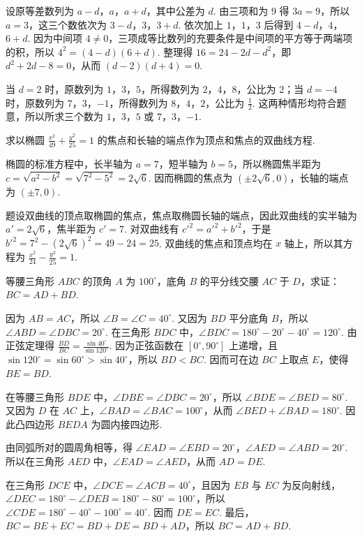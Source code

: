 \begin{solution}
设原等差数列为 \(a-d\)，\(a\)，\(a+d\)，其中公差为 \(d\). 由三项和为 \(9\) 得 \(3a=9\)，所以 \(a=3\)，这三个数依次为 \(3-d\)，\(3\)，\(3+d\). 依次加上 \(1\)，\(1\)，\(3\) 后得到 \(4-d\)，\(4\)，\(6+d\). 因为中间项 \(4\ne0\)，三项成等比数列的充要条件是中间项的平方等于两端项的积，所以 \(4^2=(4-d)(6+d)\). 整理得 \(16=24-2d-d^2\)，即 \(d^2+2d-8=0\)，从而 \((d-2)(d+4)=0\).

当 \(d=2\) 时，原数列为 \(1\)，\(3\)，\(5\)，所得数列为 \(2\)，\(4\)，\(8\)，公比为 \(2\)；当 \(d=-4\) 时，原数列为 \(7\)，\(3\)，\(-1\)，所得数列为 \(8\)，\(4\)，\(2\)，公比为 \(\frac12\). 这两种情形均符合题意，所以所求三个数为 \(1\)，\(3\)，\(5\) 或 \(7\)，\(3\)，\(-1\).
\end{solution}

\begin{problem}
求以椭圆 \( \frac{x^2}{49}+\frac{y^2}{25}=1 \) 的焦点和长轴的端点作为顶点和焦点的双曲线方程.
\end{problem}

\begin{solution}
椭圆的标准方程中，长半轴为 \(a=7\)，短半轴为 \(b=5\)，所以椭圆焦半距为 \(c=\sqrt{a^2-b^2}=\sqrt{7^2-5^2}=2\sqrt6\). 因而椭圆的焦点为 \((\pm2\sqrt6,0)\)，长轴的端点为 \((\pm7,0)\).

题设双曲线的顶点取椭圆的焦点，焦点取椭圆长轴的端点，因此双曲线的实半轴为 \(a'=2\sqrt6\)，焦半距为 \(c'=7\). 对双曲线有 \({c'}^2={a'}^2+{b'}^2\)，于是 \({b'}^2=7^2-(2\sqrt6)^2=49-24=25\). 双曲线的焦点和顶点均在 \(x\) 轴上，所以其方程为 \(\frac{x^2}{24}-\frac{y^2}{25}=1\).
\end{solution}

\begin{problem}
等腰三角形 \(ABC\) 的顶角 \(A\) 为 \( 100^\circ \)，底角 \(B\) 的平分线交腰 \(AC\) 于 \(D\)，求证：\( BC=AD+BD \).
\end{problem}

\begin{solution}
因为 \(AB=AC\)，所以 \(\angle B=\angle C=40^\circ\). 又因为 \(BD\) 平分底角 \(B\)，所以 \(\angle ABD=\angle DBC=20^\circ\). 在三角形 \(BDC\) 中，\(\angle BDC=180^\circ-20^\circ-40^\circ=120^\circ\). 由正弦定理得 \(\frac{BD}{BC}=\frac{\sin40^\circ}{\sin120^\circ}\). 因为正弦函数在 \([0^\circ,90^\circ]\) 上递增，且 \(\sin120^\circ=\sin60^\circ>\sin40^\circ\)，所以 \(BD<BC\). 因而可在边 \(BC\) 上取点 \(E\)，使得 \(BE=BD\).

在等腰三角形 \(BDE\) 中，\(\angle DBE=\angle DBC=20^\circ\)，所以 \(\angle BDE=\angle BED=80^\circ\). 又因为 \(D\) 在 \(AC\) 上，\(\angle BAD=\angle BAC=100^\circ\)，从而 \(\angle BED+\angle BAD=180^\circ\). 因此凸四边形 \(BEDA\) 为圆内接四边形.

由同弧所对的圆周角相等，得 \(\angle EAD=\angle EBD=20^\circ\)，\(\angle AED=\angle ABD=20^\circ\). 所以在三角形 \(AED\) 中，\(\angle EAD=\angle AED\)，从而 \(AD=DE\).

在三角形 \(DCE\) 中，\(\angle DCE=\angle ACB=40^\circ\)，且因为 \(EB\) 与 \(EC\) 为反向射线，\(\angle DEC=180^\circ-\angle DEB=180^\circ-80^\circ=100^\circ\)，所以 \(\angle CDE=180^\circ-40^\circ-100^\circ=40^\circ\). 因而 \(DE=EC\). 最后，\(BC=BE+EC=BD+DE=BD+AD\)，所以 \(BC=AD+BD\).
\end{solution}
